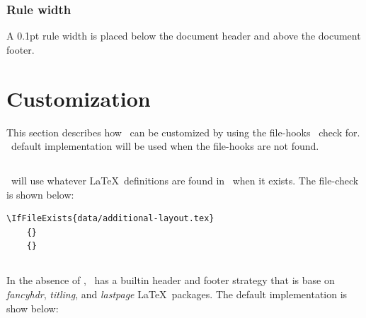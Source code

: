 \documentclass[12pt]{tlc-article}
\begin{document}

\subsubsection*{Rule width}
A 0.1pt rule width is placed below the document header and above the document
footer.


\clearpage
\section{Customization}
This section describes how \tlcA\ can be customized by using the file-hooks
\tlcA\ check for.  \tlcA\ default implementation will be used when the
file-hooks are not found.

\tlcVspace

%


\subsection{\tlcAL}
\tlcA\ will use whatever \LaTeX\ definitions are found in \tlcAL\ when it
exists.  The file-check is shown
below:

\begin{lstlisting}[basicstyle=\tiny]
  \IfFileExists{data/additional-layout.tex}
    {}
    {}
\end{lstlisting}


\subsection{\tlcHF}
In the absence of \tlcHF, \tlcA\ has a builtin header and footer strategy that
is base on \textit{fancyhdr}, \textit{titling}, and \textit{lastpage} \LaTeX\
packages. The default implementation is show below:
\end{document}
